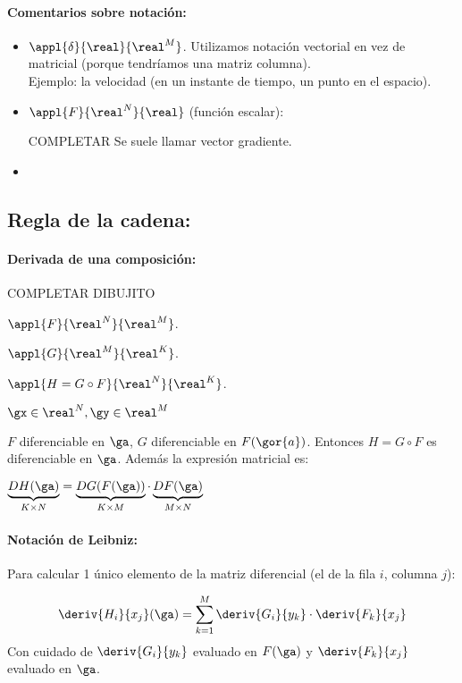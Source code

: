\paragraph{Comentarios sobre notación: }
\begin{itemize}
 \item $\appl{\delta}{\real}{\real^M}$. Utilizamos notación vectorial en vez de matricial (porque tendríamos una matriz columna).\\
 Ejemplo: la velocidad (en un instante de tiempo, un punto en el espacio).
 \item $\appl{F}{\real^N}{\real}$ (función escalar):

 COMPLETAR
 Se suele llamar vector gradiente.
 \item 
\end{itemize}

\subsection{Regla de la cadena: }
\paragraph{Derivada de una composición:\\}

COMPLETAR DIBUJITO

$\appl{F}{\real^N}{\real^M}$. 

$\appl{G}{\real^M}{\real^K}$.

$\appl{H=G\circ F}{\real^N}{\real^K}$.

$ \gx \in \real^N, \gy \in \real^M$

$F$ diferenciable en $\ga$, $G$ diferenciable en $F(\gor{a})$. Entonces $H=G\circ F$ es diferenciable en $\ga $.
Además la expresión matricial es:

$\underbrace{DH(\ga)}_{K\times N} = \underbrace{DG(F(\ga))}_{K\times M}\cdot \underbrace{DF(\ga)}_{M\times N}$
 
\obs
\paragraph{Notación de Leibniz:}

Para calcular 1 único elemento de la matriz diferencial (el de la fila $i$, columna $j$):

$$\deriv{H_i}{x_j}(\ga) = \displaystyle\sum_{k=1}^M \deriv{G_i}{y_k}\cdot\deriv{F_k}{x_j}$$
Con cuidado de $\displaystyle \deriv{G_i}{y_k}$ evaluado en $\displaystyle F(\ga)$ y $\displaystyle\deriv{F_k}{x_j}$ evaluado en $\ga$.

